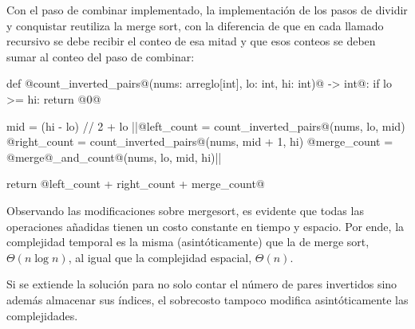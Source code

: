 Con el paso de combinar implementado, la implementación de los pasos de dividir y conquistar reutiliza la merge sort, con la diferencia de que en cada llamado recursivo se debe recibir el conteo de esa mitad y que esos conteos se deben sumar al conteo del paso de combinar:
\begin{codeblock}
\begin{pseudocode}[style=derived]
def @count_inverted_pairs@(nums: arreglo[int], lo: int, hi: int)@ -> int@:
    if lo >= hi: return @0@

    mid = (hi - lo) // 2 + lo
    ||@left_count = count_inverted_pairs@(nums, lo, mid)
    @right_count = count_inverted_pairs@(nums, mid + 1, hi)
    @merge_count = @merge@_and_count@(nums, lo, mid, hi)||

    return @left_count + right_count + merge_count@
\end{pseudocode}
\begin{annotations}
\end{annotations}
\end{codeblock}

Observando las modificaciones sobre mergesort, es evidente que todas las operaciones añadidas tienen un costo constante en tiempo y espacio. Por ende, la complejidad temporal es la misma (asintóticamente) que la de merge sort, \(\Theta(n\log n)\),  al igual que la complejidad espacial, \(\Theta(n)\).

Si se extiende la solución para no solo contar el número de pares invertidos sino además almacenar sus índices, el sobrecosto tampoco modifica asintóticamente las complejidades.

